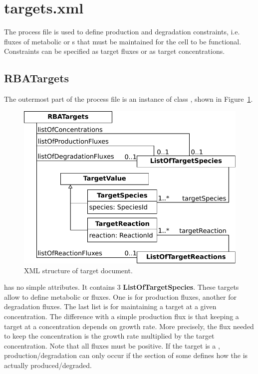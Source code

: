 
\section{targets.xml}

The process file is used to define production and degradation constraints,
i.e. fluxes of metabolic \species{} or \macromolecule{}s that must be maintained
for the cell to be functional.
Constraints can be specified as target fluxes or as target concentrations.

\subsection{RBATargets}
\label{sec:rba_targets}

The outermost part of the process file is an instance of class
\rbatargets, shown in Figure~\ref{fig:targets_doc}.

\begin{figure}
  \centering
  \includegraphics[scale=0.8]{figures/targets_doc}
  \caption{XML structure of target document.}
\label{fig:targets_doc}
\end{figure}

\rbatargets{} has no simple attributes.
It contains 3 \textbf{ListOfTargetSpecies}.
These targets allow to define metabolic \species{} or \macromolecule{} fluxes.
One is for production fluxes, another for degradation fluxes.
The last list is for maintaining a target at a given concentration.
The difference with a simple production flux is that keeping a target at a
concentration depends on growth rate.
More precisely, the flux needed to keep the concentration is
the growth rate multiplied by the target concentration.
Note that all fluxes must be positive.
If the target is a \macromolecule, production/degradation can only occur
if the \processings{} section of some \process{} defines how the
\macromolecule{} is actually produced/degraded.


